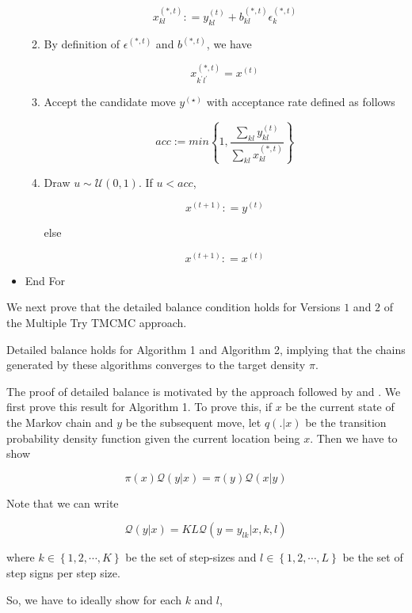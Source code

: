 \begin{algorithm}
\begin{itemize}
\begin{enumerate}
$$ x^{(*,t)}_{kl} : =  y^{(t)}_{kl}  + b^{(*,t)}_{kl} \epsilon^{(*,t)}_{k} $$

\item By definition of $\epsilon^{(*,t)}$ and $b^{(*,t)}$, we have 

$$ x^{(*,t)}_{k^{'}l^{'}} = x^{(t)} $$

\item Accept the candidate move $y^{(\star)}$ with acceptance rate defined as follows 

$$ acc :=  min \left \{ 1, \frac{\sum_{kl}  y^{(t)}_{kl} } {\sum_{kl} x^{(*,t)}_{kl} } \right \}  $$

\item Draw $u \sim \mathcal{U}(0,1)$. If $u < acc$, 

$$ x^{(t+1)} : = y^{(t)}  $$

else 

$$ x^{(t+1)} : = x^{(t)} $$
\end{enumerate}
\item  End For
\end{itemize}
\end{algorithm}

We next prove that the detailed balance condition holds for Versions $1$ and $2$ of the Multiple Try TMCMC approach. 

\begin{theorem}
\label{theorem:theorem1}
Detailed balance holds for Algorithm 1 and Algorithm 2, implying that the chains generated by these algorithms converges to the target density $\pi$. 
\end{theorem}

The proof of detailed balance is motivated by the approach followed by \cite{Liu2000} and \cite{Martino2013}. We first prove this result for Algorithm 1. To prove this, if $x$ be the current state of the Markov chain and $y$ be the subsequent move, let $q(.|x)$ be the transition probability density function given the current location being $x$. Then we have to show 

$$ \pi(x) \mathcal{Q}(y | x)  = \pi(y) \mathcal{Q}(x | y) $$

Note that we can write 

$$ \mathcal{Q}(y | x) = KL \mathcal{Q}(y= y_{lk} | x, k, l) $$

where $k \in \left \{ 1, 2, \cdots, K \right \}$ be the set of step-sizes  and $l  \in \left \{ 1, 2, \cdots, L \right \}$ be the set of step signs per step size.  

So, we have to ideally show for each $k$ and $l$, 

